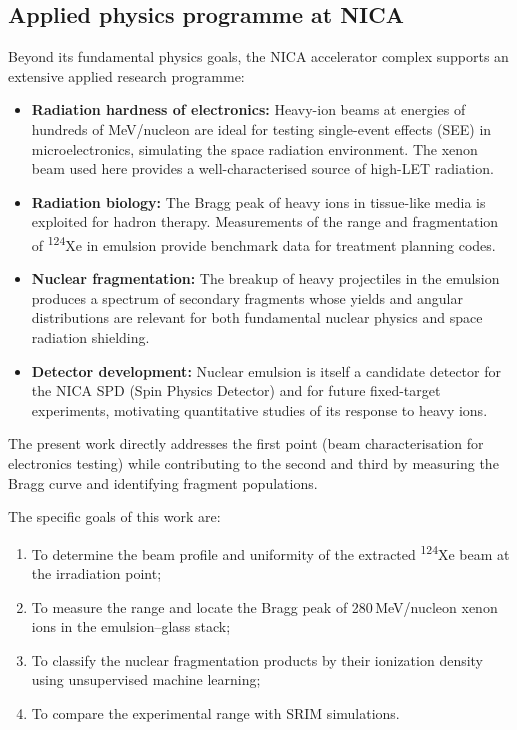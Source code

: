 \documentclass[12pt,a4paper]{article}
\begin{document}
\subsection{Applied physics programme at NICA}

Beyond its fundamental physics goals, the NICA accelerator complex
supports an extensive applied research programme:

\begin{itemize}
  \item \textbf{Radiation hardness of electronics:} Heavy-ion beams at
        energies of hundreds of MeV/nucleon are ideal for testing
        single-event effects (SEE) in microelectronics, simulating the
        space radiation environment. The xenon beam used here provides
        a well-characterised source of high-LET radiation.
  \item \textbf{Radiation biology:} The Bragg peak of heavy ions in
        tissue-like media is exploited for hadron therapy. Measurements
        of the range and fragmentation of \textsuperscript{124}Xe in
        emulsion provide benchmark data for treatment planning codes.
  \item \textbf{Nuclear fragmentation:} The breakup of heavy projectiles
        in the emulsion produces a spectrum of secondary fragments
        whose yields and angular distributions are relevant for both
        fundamental nuclear physics and space radiation shielding.
  \item \textbf{Detector development:} Nuclear emulsion is itself a
        candidate detector for the NICA SPD (Spin Physics Detector)
        and for future fixed-target experiments, motivating
        quantitative studies of its response to heavy ions.
\end{itemize}

The present work directly addresses the first point (beam characterisation
for electronics testing) while contributing to the second and third by
measuring the Bragg curve and identifying fragment populations.

The specific goals of this work are:

\begin{enumerate}
  \item To determine the beam profile and uniformity of the extracted
        \textsuperscript{124}Xe beam at the irradiation point;
  \item To measure the range and locate the Bragg peak of
        280\,MeV/nucleon xenon ions in the emulsion--glass stack;
  \item To classify the nuclear fragmentation products by their
        ionization density using unsupervised machine learning;
  \item To compare the experimental range with SRIM simulations.
\end{enumerate}
\end{document}
